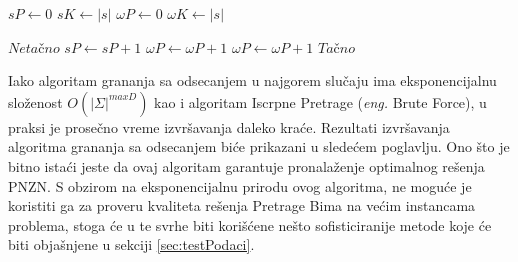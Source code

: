 \documentclass[12pt,oneside]{memoir}
\begin{document}
  \begin{algorithm}
    \caption{$\textbf{Podniska}\bm{(s,\omega)}$}
    \label{alg:podNiska}
    \begin{algorithmic}[1]
    \State $sP \gets 0$ 
    \State $sK \gets |s|$ 
    \State $\omega P \gets 0$ 
    \State $\omega K \gets |s|$ 

    \State
        \State \Return $Neta\textrm{č}no$
        \State $sP \gets sP + 1$
        \State $\omega P \gets \omega P + 1$
      \Else
        \State $\omega P \gets \omega P + 1$
      \EndIf
    \EndWhile
    \State
    \State \Return $Ta\textrm{č}no$
    \end{algorithmic}
    \end{algorithm}
Iako algoritam grananja sa odsecanjem u najgorem slučaju ima eksponencijalnu složenost $O(|\Sigma|^{maxD})$
kao i algoritam Iscrpne Pretrage (\textit{eng.} Brute Force), u praksi je prosečno vreme izvršavanja
daleko kraće. Rezultati izvršavanja algoritma grananja sa odsecanjem biće prikazani u sledećem poglavlju.
Ono što je bitno istaći jeste da ovaj algoritam garantuje pronalaženje optimalnog rešenja PNZN.
S obzirom na eksponencijalnu prirodu ovog algoritma, ne moguće je koristiti ga
za proveru kvaliteta rešenja Pretrage Bima na većim instancama problema, stoga će u te svrhe biti korišćene
nešto sofisticiranije metode koje će biti objašnjene u sekciji \ref{sec:testPodaci}.

\end{document}
